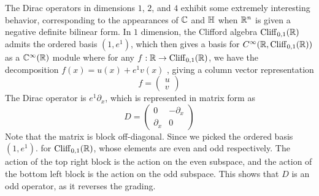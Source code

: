 The Dirac operators in dimensions $1$, $2$, and $4$ exhibit some extremely
interesting behavior, corresponding to the appearances of $\mathbb{C}$ and $\mathbb{H}$
when $\mathbb{R}^n$ is given a negative definite bilinear form. In $1$ dimension,
the Clifford algebra $\operatorname{Cliff}_{0,1}(\mathbb{R})$ admits the ordered basis $(1,e^1)$, which
then gives a basis for $C^\infty(\mathbb{R}, \operatorname{Cliff}_{0,1}(\mathbb{R}))$ as a
$\mathbb{C}^\infty(\mathbb{R})$ module where for any $f : \mathbb{R} \to \operatorname{Cliff}_{0,1}(\mathbb{R})$, we have the
decomposition $f(x) = u(x) + e^1 v(x)$ , giving a column vector representation
\[
f = \begin{pmatrix}
u \\
v
\end{pmatrix}
\]
The Dirac operator is $e^1\partial_x$, which is represented in matrix form as
\[
D = \begin{pmatrix}
0 & -\partial_x \\
\partial_x & 0
\end{pmatrix}
\]
Note that the matrix is block off-diagonal. Since we picked the ordered basis $(1,e^1)$.
for $\operatorname{Cliff}_{0,1}(\mathbb{R})$, whose elements are even and odd respectively. The action
of the top right block is the action on the even subspace, and the action of
the bottom left block is the action on the odd subspace. This
shows that $D$ is an odd operator, as it reverses the grading. \\


